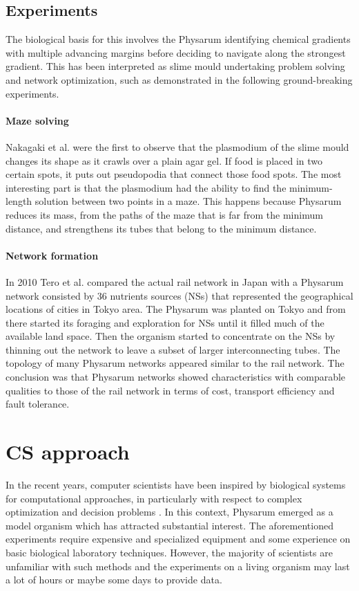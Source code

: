 \subsection{Experiments}
The biological basis for this involves the Physarum identifying chemical gradients with multiple advancing margins before deciding to navigate along the strongest gradient. This has been interpreted as slime mould undertaking problem solving and network optimization, such as demonstrated in the following ground-breaking experiments.

\paragraph{Maze solving}
Nakagaki et al. \cite{nakagaki2000intelligence} were the first to observe that the plasmodium of the slime mould changes its shape as it crawls over a plain agar gel. If food is placed in two certain spots, it puts out pseudopodia that connect those food spots. The most interesting part is that the plasmodium had the ability to find the minimum-length solution between two points in a maze. This happens because Physarum reduces its mass, from the paths of the maze that is far from the minimum distance, and strengthens its tubes that belong to the minimum distance.

\paragraph{Network formation}
In 2010 Tero et al. \cite{Tero439} compared the actual rail network in Japan with a Physarum network consisted by 36 nutrients sources (NSs) that represented the geographical locations of cities in Tokyo area. The Physarum was planted on Tokyo and from there started its foraging  and exploration for NSs until it filled much of the available land space. Then the organism started to concentrate on the NSs by thinning out the network to leave a subset of larger interconnecting tubes. The topology of many Physarum networks appeared similar to the rail network. The conclusion was that Physarum networks showed characteristics with comparable qualities to those of the rail network in terms of cost, transport efficiency and fault tolerance.\\

\section{CS approach}
In the recent years, computer scientists have been inspired by biological systems for computational approaches, in particularly with respect to complex optimization and decision problems \cite{grube2016physarum}. In this context, Physarum emerged as a model organism which has attracted substantial interest. The aforementioned experiments require expensive and specialized equipment and some experience on basic biological laboratory techniques. However, the majority of scientists are unfamiliar with such methods and the experiments on a living organism may last a lot of hours or maybe some days to provide data.

